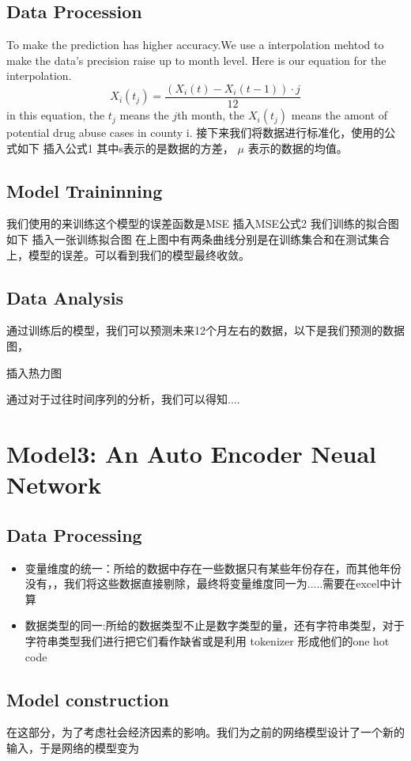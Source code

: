 \documentclass{mcmthesis}
\begin{document}
		\subsection{Data Procession}
		To make the prediction has higher accuracy.We use a interpolation mehtod to make the data's precision raise up to month level. Here is our equation for the interpolation.
		\begin{equation}
		X_{i}(t_{j}) = \frac{(X_{i}(t) - X_{i}(t-1)) \cdot j}{12} 
		\end{equation}
		in this equation, the $t_{j}$ means the $j$th month, the $X_{i}(t_{j})$ means the amont of potential drug abuse cases in county i.
		接下来我们将数据进行标准化，使用的公式如下
		插入公式1
		其中s表示的是数据的方差， $\mu$ 表示的数据的均值。
		
		\subsection{Model Traininning}
		我们使用的来训练这个模型的误差函数是MSE
		插入MSE公式2
		我们训练的拟合图如下
		插入一张训练拟合图
		在上图中有两条曲线分别是在训练集合和在测试集合上，模型的误差。可以看到我们的模型最终收敛。
		\subsection{Data Analysis}
		通过训练后的模型，我们可以预测未来12个月左右的数据，以下是我们预测的数据图，
		
		插入热力图
		
		通过对于过往时间序列的分析，我们可以得知....
			
\section{Model3: An Auto Encoder Neual Network}
	\subsection{Data Processing}
	\begin{itemize}
		\item 变量维度的统一：所给的数据中存在一些数据只有某些年份存在，而其他年份没有，，我们将这些数据直接剔除，最终将变量维度同一为.....需要在excel中计算
		\item 数据类型的同一:所给的数据类型不止是数字类型的量，还有字符串类型，对于字符串类型我们进行把它们看作缺省或是利用 tokenizer 形成他们的one hot code
	\end{itemize}
	\subsection{Model construction}
	在这部分，为了考虑社会经济因素的影响。我们为之前的网络模型设计了一个新的输入，于是网络的模型变为
	
\end{document}
